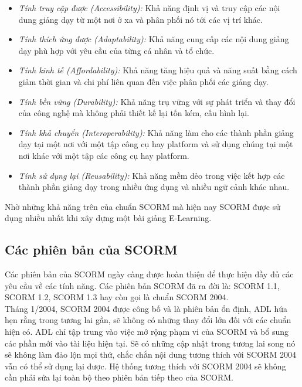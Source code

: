 	\begin{itemize}
	
		\item \textit{Tính truy cập được (Accessibility):} Khả năng định vị và truy cập các nội dung giảng dạy từ một nơi ở xa và phân phối nó tới các vị trí khác.
	
		\item \textit{Tính thích ứng được (Adaptability):} Khả năng cung cấp các nội dung giảng dạy phù hợp với yêu cầu của từng cá nhân và tổ chức.
	
		\item \textit{Tính kinh tế (Affordability):} Khả năng tăng hiệu quả và năng suất bằng cách giảm thời gian và chi phí liên quan đến việc phân phối các giảng dạy.
	
		\item \textit{Tính bền vững (Durability):} Khả năng trụ vững với sự phát triển và thay đổi của công nghệ mà không phải thiết kế lại tốn kém, cấu hình lại.
	
		\item \textit{Tính khả chuyển (Interoperability):} Khả năng làm cho các thành phần giảng dạy tại một nơi với một tập công cụ hay platform và sử dụng chúng tại một nơi khác với một tập các công cụ hay platform.
	
		\item \textit{Tính sử dụng lại (Reusability):} Khả năng mềm dẻo trong việc kết hợp các thành phần giảng dạy trong nhiều ứng dụng và nhiều ngữ cảnh khác nhau.
	
	\end{itemize}


	Nhờ những khả năng trên của chuẩn SCORM mà hiện nay SCORM được sử dụng nhiều nhất khi xây dựng một bài giảng E-Learning.
	
\newpage

	\subsection{Các phiên bản của SCORM}
	
	Các phiên bản của SCORM ngày càng được hoàn thiện để thực hiện đầy đủ các yêu cầu về các tính năng. Các phiên bản SCORM đã ra đời là: SCORM 1.1, SCORM 1.2, SCORM 1.3 hay còn gọi là chuẩn SCORM 2004. \\

	Tháng 1/2004, SCORM 2004 được công bố và là phiên bản ổn định, ADL hứa hẹn rằng trong tương lai gần, sẽ không có những thay đổi lớn đối với các chuẩn hiện có. ADL chỉ tập trung vào việc mở rộng phạm vi của SCORM và bổ sung các phần mới vào tài liệu hiện tại. Sẽ có những cập nhật trong tương lai song nó sẽ không làm đảo lộn mọi thứ, chắc chắn nội dung tương thích với SCORM 2004 vẫn có thể sử dụng lại được. Hệ thống tương thích với SCORM 2004 sẽ không cần phải sửa lại toàn bộ theo phiên bản tiếp theo của SCORM. \\

